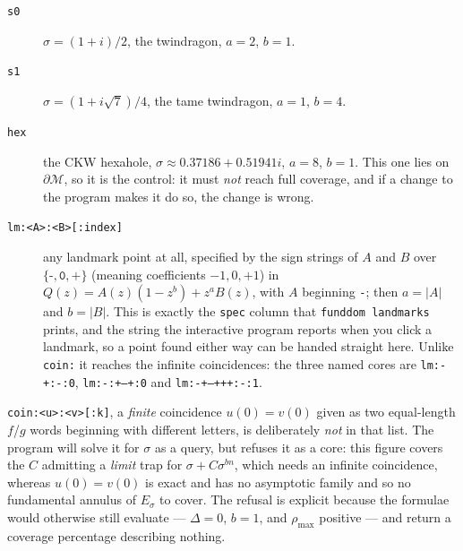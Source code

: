 \documentclass{amsart}
\begin{document}
\begin{description}
\item[\texttt{s0}] $\sigma = (1+i)/2$, the twindragon, $a = 2$, $b = 1$.
\item[\texttt{s1}] $\sigma = (1 + i\sqrt7)/4$, the tame twindragon, $a = 1$, $b = 4$.
\item[\texttt{hex}] the CKW hexahole, $\sigma \approx 0.37186 + 0.51941i$, $a = 8$, $b = 1$.  This
one lies on $\partial\mathcal{M}$, so it is the control: it must \emph{not} reach full coverage,
and if a change to the program makes it do so, the change is wrong.
\item[\texttt{lm:<A>:<B>[:index]}] any landmark point at all, specified by the sign strings of
$A$ and $B$ over $\{\texttt{-},\texttt{0},\texttt{+}\}$ (meaning coefficients $-1, 0, +1$) in
$Q(z) = A(z)(1 - z^b) + z^a B(z)$, with $A$ beginning \texttt{-}; then $a = |A|$ and $b = |B|$.
This is exactly the \texttt{spec} column that \texttt{funddom landmarks} prints, and the string
the interactive program reports when you click a landmark, so a point found either way can be
handed straight here.  Unlike \texttt{coin:} it reaches the infinite coincidences: the three named
cores are \texttt{lm:-+:-:0}, \texttt{lm:-:+--+:0} and \texttt{lm:-+---+++:-:1}.
\end{description}

\texttt{coin:<u>:<v>[:k]}, a \emph{finite} coincidence $u(0) = v(0)$ given as two equal-length
$f$/$g$ words beginning with different letters, is deliberately \emph{not} in that list.  The
program will solve it for $\sigma$ as a query, but refuses it as a core: this figure covers the
$C$ admitting a \emph{limit} trap for $\sigma + C\sigma^{bn}$, which needs an infinite
coincidence, whereas $u(0) = v(0)$ is exact and has no asymptotic family and so no fundamental
annulus of $E_\sigma$ to cover.  The refusal is explicit because the formulae would otherwise
still evaluate --- $\Delta = 0$, $b = 1$, and $\rho_{\max}$ positive --- and return a coverage
percentage describing nothing.
\end{document}
